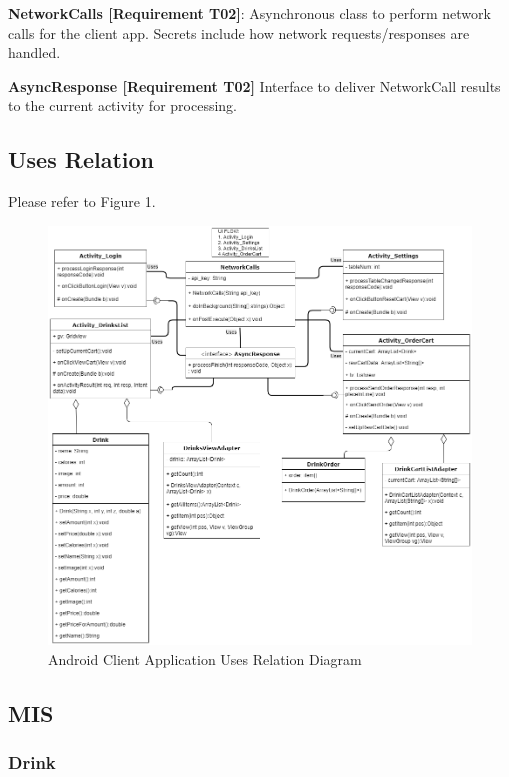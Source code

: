 \documentclass [10pt]{article}
\begin{document}
\textbf{NetworkCalls [Requirement T02]}: Asynchronous class to perform network calls for the client app. Secrets include how network requests/responses are handled.

\textbf{AsyncResponse [Requirement T02]} Interface to deliver NetworkCall results to the current activity for processing.

\subsection{Uses Relation}

Please refer to Figure 1.

\begin{figure} [h!]
	\centering
	\includegraphics [scale = 0.4] {figures/Client_UsesDiagram.png}
	\caption{Android Client Application Uses Relation Diagram}
\end{figure}



\subsection{MIS}

\subsubsection{Drink}
\end{document}
